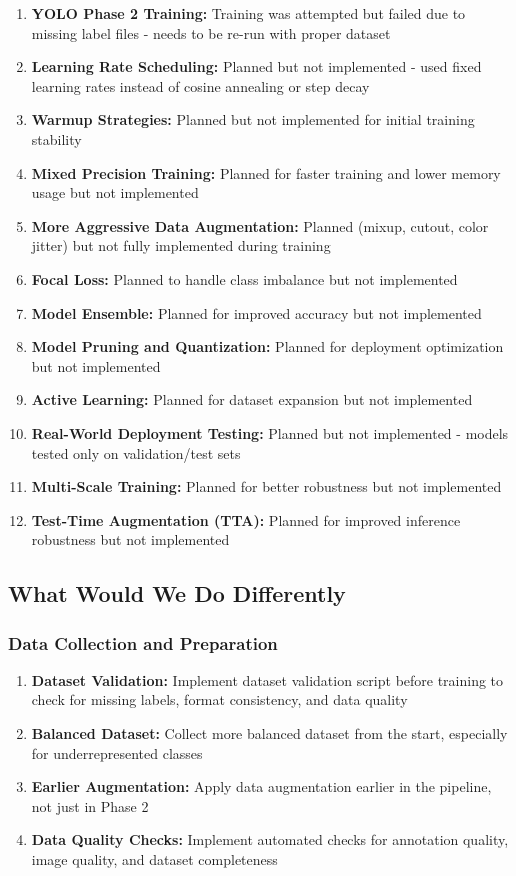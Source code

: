 \documentclass[12pt,a4paper]{article}
\begin{document}
\begin{enumerate}
    \item \textbf{YOLO Phase 2 Training:} Training was attempted but failed due to missing label files - needs to be re-run with proper dataset
    \item \textbf{Learning Rate Scheduling:} Planned but not implemented - used fixed learning rates instead of cosine annealing or step decay
    \item \textbf{Warmup Strategies:} Planned but not implemented for initial training stability
    \item \textbf{Mixed Precision Training:} Planned for faster training and lower memory usage but not implemented
    \item \textbf{More Aggressive Data Augmentation:} Planned (mixup, cutout, color jitter) but not fully implemented during training
    \item \textbf{Focal Loss:} Planned to handle class imbalance but not implemented
    \item \textbf{Model Ensemble:} Planned for improved accuracy but not implemented
    \item \textbf{Model Pruning and Quantization:} Planned for deployment optimization but not implemented
    \item \textbf{Active Learning:} Planned for dataset expansion but not implemented
    \item \textbf{Real-World Deployment Testing:} Planned but not implemented - models tested only on validation/test sets
    \item \textbf{Multi-Scale Training:} Planned for better robustness but not implemented
    \item \textbf{Test-Time Augmentation (TTA):} Planned for improved inference robustness but not implemented
\end{enumerate}

\subsection{What Would We Do Differently}

\subsubsection{Data Collection and Preparation}

\begin{enumerate}
    \item \textbf{Dataset Validation:} Implement dataset validation script before training to check for missing labels, format consistency, and data quality
    \item \textbf{Balanced Dataset:} Collect more balanced dataset from the start, especially for underrepresented classes
    \item \textbf{Earlier Augmentation:} Apply data augmentation earlier in the pipeline, not just in Phase 2
    \item \textbf{Data Quality Checks:} Implement automated checks for annotation quality, image quality, and dataset completeness
\end{enumerate}
\end{document}
